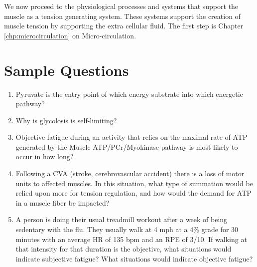 We now proceed to the physiological processes and systems that support the muscle as a tension generating system. These systems support the creation of muscle tension by supporting the extra cellular fluid. The first step is Chapter \ref{chp:microcirculation} on Micro-circulation. 

\printbibliography[heading=subbibintoc]

\section*{Sample Questions}

\begin{enumerate}
    \item Pyruvate is the entry point of which energy substrate into which energetic pathway?
    \item Why is glycolosis is self-limiting?
    \item Objective fatigue during an activity that relies on the maximal rate of ATP generated by the Muscle ATP/PCr/Myokinase pathway is most likely to occur in how long?
    \item Following a CVA (stroke, cerebrovascular accident) there is a loss of motor units to affected muscles. In this situation, what type of summation would be relied upon more for tension regulation, and how would the demand for ATP in a muscle fiber be impacted?
    \item A person is doing their usual treadmill workout after a week of being sedentary with the flu. They usually walk at 4 mph at a 4\% grade for 30 minutes with an average HR of 135 bpm and an RPE of 3/10. If walking at that intensity for that duration is the objective, what situations would indicate subjective fatigue? What situations would indicate objective fatigue?
\end{enumerate} 